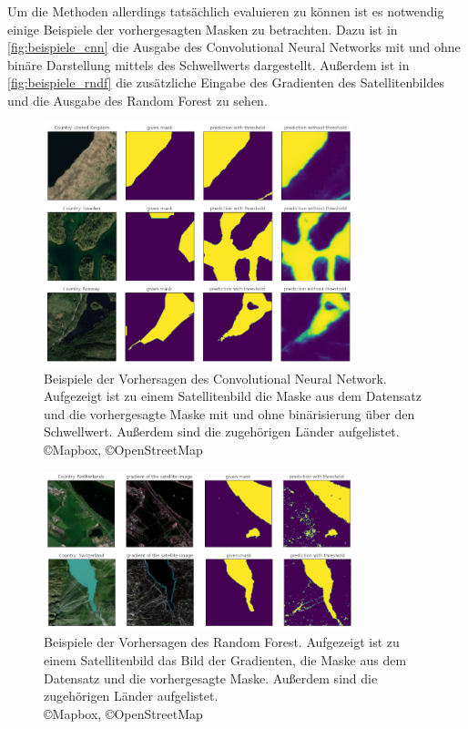 Um die Methoden allerdings tatsächlich evaluieren zu können ist es notwendig einige Beispiele der vorhergesagten Masken zu betrachten.
Dazu ist in \autoref{fig:beispiele_cnn} die Ausgabe des Convolutional Neural Networks mit und ohne binäre Darstellung mittels des Schwellwerts dargestellt.
Außerdem ist in \autoref{fig:beispiele_rndf} die zusätzliche Eingabe des Gradienten des Satellitenbildes und die Ausgabe des Random Forest zu sehen.

\begin{figure}
    \centering
    \includegraphics[width=0.8\textwidth]{images/bsp_cnn.png}
    \caption{Beispiele der Vorhersagen des Convolutional Neural Network. %
    Aufgezeigt ist zu einem Satellitenbild die Maske aus dem Datensatz und %
    die vorhergesagte Maske mit und ohne binärisierung über den Schwellwert. %
    Außerdem sind die zugehörigen Länder aufgelistet.\\ \copyright Mapbox, \copyright OpenStreetMap}
    \label{fig:beispiele_cnn}
\end{figure}

\begin{figure}
    \centering
    \includegraphics[width=0.8\textwidth]{images/bsp_rndf.png}
    \caption{Beispiele der Vorhersagen des Random Forest. %
    Aufgezeigt ist zu einem Satellitenbild das Bild der Gradienten, %
    die Maske aus dem Datensatz und %
    die vorhergesagte Maske. %
    Außerdem sind die zugehörigen Länder aufgelistet.\\ \copyright Mapbox, \copyright OpenStreetMap}
    \label{fig:beispiele_rndf}
\end{figure}


